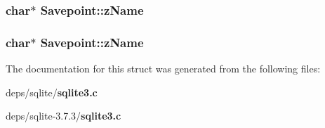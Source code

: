 \subsubsection{\setlength{\rightskip}{0pt plus 5cm}char$\ast$ \bf{Savepoint::z\-Name}}\label{structSavepoint_b3b2b6a2e348c58f486ebb39dff1c2b9}


\subsubsection{\setlength{\rightskip}{0pt plus 5cm}char$\ast$ \bf{Savepoint::z\-Name}}\label{structSavepoint_b3b2b6a2e348c58f486ebb39dff1c2b9}




The documentation for this struct was generated from the following files:\begin{CompactItemize}
\item 
deps/sqlite/\bf{sqlite3.c}\item 
deps/sqlite-3.7.3/\bf{sqlite3.c}\end{CompactItemize}
